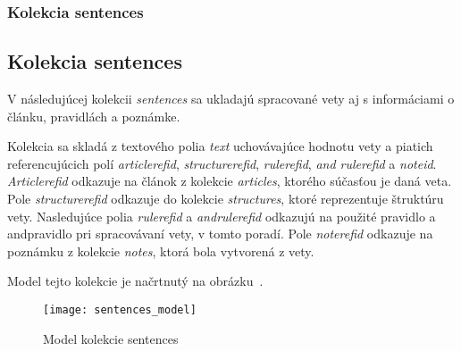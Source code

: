 %
%
{
	\subsubsection{Kolekcia sentences}
}
{
	\subsection{Kolekcia sentences}
}
\label{subsubsection:collection_sentences}
V následujúcej kolekcii \textit{sentences} sa ukladajú spracované vety aj s informáciami o článku, pravidlách a poznámke.

Kolekcia sa skladá z textového polia \textit{text} uchovávajúce hodnotu vety a piatich referencujúcich polí \textit{article\textunderscore ref\textunderscore id}, \textit{structure\textunderscore ref\textunderscore id}, \textit{rule\textunderscore ref\textunderscore id}, \textit{and \textunderscore rule\textunderscore ref\textunderscore id} a \textit{note\textunderscore id}. \textit{Article\textunderscore ref\textunderscore id} odkazuje na článok z kolekcie \textit{articles}, ktorého súčasťou je daná veta. Pole \textit{structure\textunderscore ref\textunderscore id} odkazuje do kolekcie \textit{structures}, ktoré reprezentuje štruktúru vety. Nasledujúce polia \textit{rule\textunderscore ref\textunderscore id} a \textit{and\textunderscore rule\textunderscore ref\textunderscore id} odkazujú na použité pravidlo a and\hyph pravidlo pri spracovávaní vety, v tomto poradí. Pole \textit{note\textunderscore ref\textunderscore id} odkazuje na poznámku z kolekcie \textit{notes}, ktorá bola vytvorená z vety.

Model tejto kolekcie je načrtnutý na obrázku~.

\begin{figure}[H]
	\begin{center}\texttt{[image: sentences\_model]}\end{center}
	\caption[Model kolekcie sentences]{Model kolekcie sentences}\label{fig:sentences_collection_model}
\end{figure}

